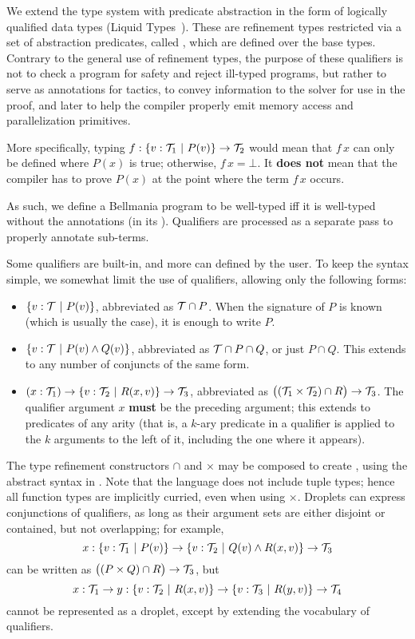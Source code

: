 We extend the type system with predicate abstraction in the form of logically qualified data types 
(Liquid Types~\cite{PLDI08/Rondon}). These are refinement types restricted via a set of abstraction predicates,
called , which are defined over the base types.
Contrary to the general use of refinement types, the purpose of these qualifiers is not to
check a program for safety and reject ill-typed programs, but rather to serve as annotations for
tactics, to convey information to the solver for use in the proof, and later to help the compiler
properly emit memory access and parallelization primitives.

More specifically, typing $f : \{v:\mathcal{T}_1 ~|~ P(v)\}\to\mathcal{T}_2$ would mean that $f\,x$
can only be defined where $P(x)$ is true; otherwise, $f\,x=\bot$. 
It {\bf does not} mean that the compiler has to prove $P(x)$ at the point where the term $f\,x$
occurs.

As such, we define a Bellmania program to be well-typed iff it is well-typed
without the annotations (in its ). Qualifiers are processed
as a separate pass to properly annotate sub-terms.

Some qualifiers are built-in, and more can defined by the user. To keep the syntax simple, we somewhat
limit the use of qualifiers, allowing only the following forms:

\begin{itemize}
  \item $\{v:\mathcal{T} ~|~ P(v)\}$, abbreviated as $\mathcal{T}\cap P$. When the signature of $P$ is known (which is
  usually the case), it is enough to write $P$.
  \item $\{v:\mathcal{T} ~|~ P(v)\land Q(v)\}$, abbreviated as $\mathcal{T}\cap P\cap Q$, or just $P\cap Q$. This extends
  to any number of conjuncts of the same form.
  \item $(x : \mathcal{T}_1) \to \{v:\mathcal{T}_2 ~|~ R(x,v)\} \to \mathcal{T}_3$, abbreviated as $\big((\mathcal{T}_1\times\mathcal{T}_2)\cap R\big)\to\mathcal{T}_3$.
  The qualifier argument $x$ {\bf must} be the preceding argument; this extends to predicates of
  any arity (that is, a $k$-ary predicate in a qualifier is applied to the $k$
  arguments to the left of it, including the one where it appears).
\end{itemize}


\medskip  
The type refinement constructors $\cap$ and $\times$ may be composed to create ,
using the abstract syntax in .
Note that the language does not include tuple types; hence all function types are
implicitly curried, even when using $\times$.
Droplets can express conjunctions of qualifiers,
as long as their argument sets are either disjoint or contained, but not overlapping;
for example, \[x:\{v:\mathcal{T}_1~|~P(v)\}\to \{v:\mathcal{T}_2~|~Q(v)\land R(x,v)\}\to\mathcal{T}_3\] can be written as
$\big((P\times Q)\cap R\big)\to\mathcal{T}_3$, but \[x:\mathcal{T}_1\to y:\{v:\mathcal{T}_2~|~R(x,v)\} \to \{v:\mathcal{T}_3~|~R(y,v)\}\to\mathcal{T}_4\]
cannot be represented as a droplet, except by extending the vocabulary of qualifiers.

